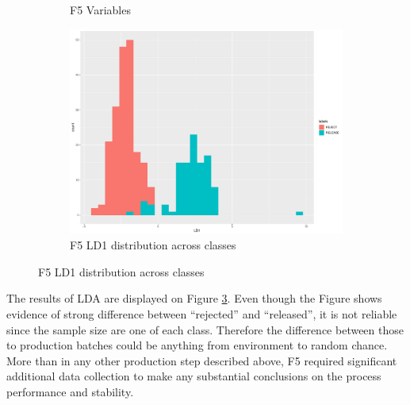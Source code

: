 \begin{figure}[ht]
\begin{subfigure}{.3\textwidth}
    \caption{F5 Variables}
    \label{fig:f5_variables}
\end{subfigure}%
\begin{subfigure}{0.3\textwidth}
    \begin{center}
    \includegraphics[width=\textwidth]{plots/f5_LD1.pdf}
    \end{center}
    \caption{F5 LD1 distribution across classes}
    \label{fig:f5_LD1}
\end{subfigure}
\end{figure}

The results of LDA are displayed on Figure \ref{fig:f5_LD1}. Even though the Figure shows evidence of strong difference between ``rejected'' and ``released'', it is not reliable since the sample size are one of each class. Therefore the difference between those to production batches could be anything from environment to random chance. More than in any other production step described above, F5 required significant additional data collection to make any substantial conclusions on the process performance and stability.

